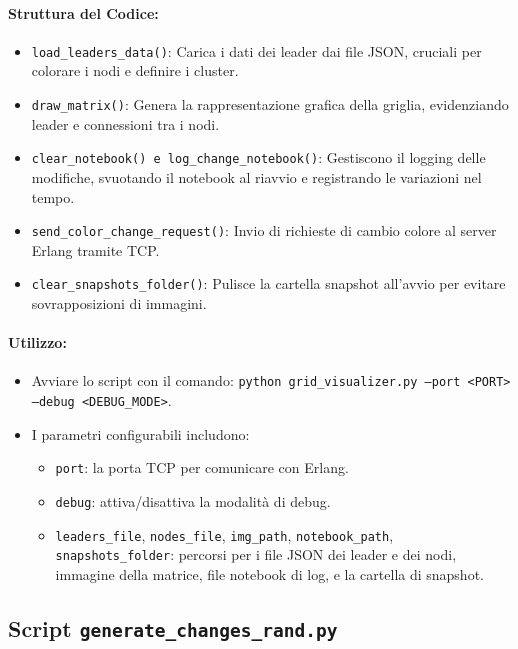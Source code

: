 \documentclass[12pt, a4paper]{report}
\begin{document}
\paragraph{Struttura del Codice:}
\begin{itemize}
    \item \texttt{load\_leaders\_data()}: Carica i dati dei leader dai file JSON, cruciali per colorare i nodi e definire i cluster.
    \item \texttt{draw\_matrix()}: Genera la rappresentazione grafica della griglia, evidenziando leader e connessioni tra i nodi.
    \item \texttt{clear\_notebook() e log\_change\_notebook()}: Gestiscono il logging delle modifiche, svuotando il notebook al riavvio e registrando le variazioni nel tempo.
    \item \texttt{send\_color\_change\_request()}: Invio di richieste di cambio colore al server Erlang tramite TCP.
    \item \texttt{clear\_snapshots\_folder()}: Pulisce la cartella snapshot all’avvio per evitare sovrapposizioni di immagini.
\end{itemize}

\paragraph{Utilizzo:}
\begin{itemize}
    \item Avviare lo script con il comando: \texttt{python grid\_visualizer.py --port <PORT> --debug <DEBUG\_MODE>}.
    \item I parametri configurabili includono: 
    \begin{itemize}
        \item \texttt{port}: la porta TCP per comunicare con Erlang.
        \item \texttt{debug}: attiva/disattiva la modalità di debug.
        \item \texttt{leaders\_file}, \texttt{nodes\_file}, \texttt{img\_path}, \texttt{notebook\_path}, \texttt{snapshots\_folder}: percorsi per i file JSON dei leader e dei nodi, immagine della matrice, file notebook di log, e la cartella di snapshot.
    \end{itemize}
\end{itemize}

\subsection{Script \texttt{generate\_changes\_rand.py}}\label{sec:random_changes}
\end{document}

